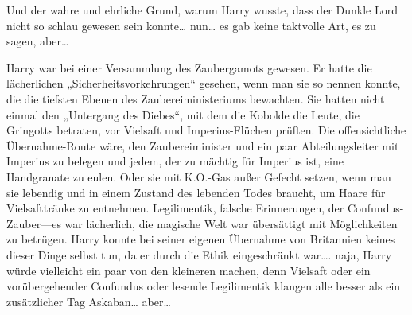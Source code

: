 Und der wahre und ehrliche Grund, warum Harry wusste, dass der Dunkle Lord nicht so schlau gewesen sein konnte… nun… es gab keine taktvolle Art, es zu sagen, aber…

Harry war bei einer Versammlung des Zaubergamots gewesen. Er hatte die lächerlichen „Sicherheitsvorkehrungen“ gesehen, wenn man sie so nennen konnte, die die tiefsten Ebenen des Zaubereiministeriums bewachten. Sie hatten nicht einmal den „Untergang des Diebes“, mit dem die Kobolde die Leute, die Gringotts betraten, vor Vielsaft und Imperius-Flüchen prüften. Die offensichtliche Übernahme-Route wäre, den Zaubereiminister und ein paar Abteilungsleiter mit Imperius zu belegen und jedem, der zu mächtig für Imperius ist, eine Handgranate zu eulen. Oder sie mit K.O.-Gas außer Gefecht setzen, wenn man sie lebendig und in einem Zustand des lebenden Todes braucht, um Haare für Vielsafttränke zu entnehmen. Legilimentik, falsche Erinnerungen, der Confundus-Zauber—es war lächerlich, die magische Welt war übersättigt mit Möglichkeiten zu betrügen. Harry konnte bei seiner eigenen Übernahme von Britannien keines dieser Dinge selbst tun, da er durch die Ethik eingeschränkt war…. naja, Harry würde vielleicht ein paar von den kleineren machen, denn Vielsaft oder ein vorübergehender Confundus oder lesende Legilimentik klangen alle besser als ein zusätzlicher Tag Askaban… aber…

